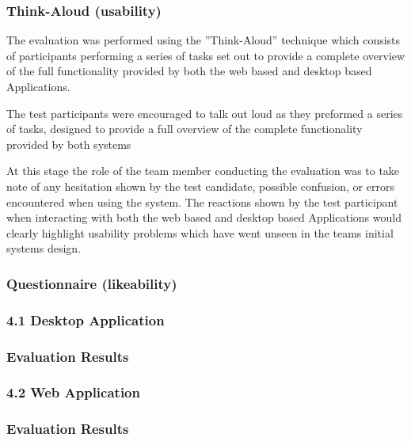 \subsubsection{Think-Aloud (usability) }

The evaluation was performed using the ”Think-Aloud” technique  which consists of participants performing a series of tasks set out to provide a complete overview of the full functionality provided by both the web based and desktop based Applications. 

The test participants were encouraged to talk out loud as they preformed a series of tasks, designed to provide a full overview of the complete functionality provided by both systems 

At this stage the role of the team member conducting the evaluation was to take note of any hesitation shown by the test candidate, possible confusion, or errors encountered when using the system. The reactions shown by the test participant when interacting with both the web based and desktop based Applications would clearly highlight usability problems which have went unseen in the teams initial systems design. 


\subsubsection{Questionnaire (likeability)}

\subsubsection{4.1 Desktop Application}





\subsubsection{Evaluation Results}

\subsubsection{4.2 Web Application}

\subsubsection{Evaluation Results}

















































